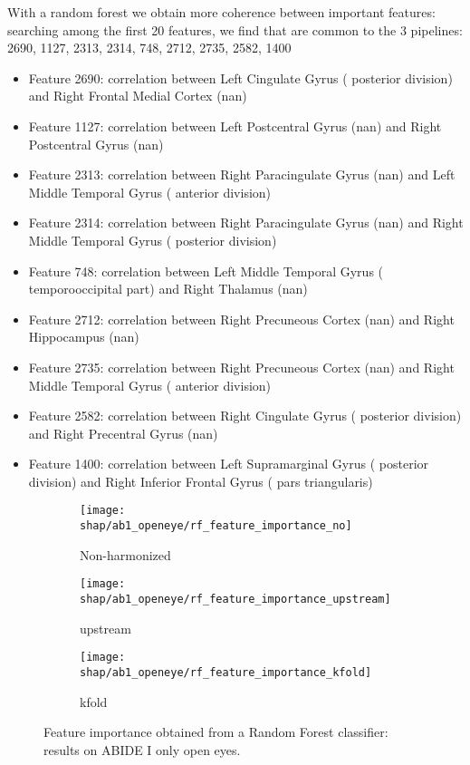 \documentclass[11pt]{report}
\begin{document}
With a random forest we obtain more coherence between important features: searching among the first 20 features, we find that
are common to the 3 pipelines: 2690, 1127, 2313, 2314, 748, 2712, 2735, 2582, 1400



\begin{itemize}
\item Feature 2690: correlation between Left Cingulate Gyrus ( posterior division) and Right Frontal Medial Cortex (nan)
\item Feature 1127: correlation between Left Postcentral Gyrus (nan) and Right Postcentral Gyrus (nan)
\item Feature 2313: correlation between Right Paracingulate Gyrus (nan) and Left Middle Temporal Gyrus ( anterior division)
\item Feature 2314: correlation between Right Paracingulate Gyrus (nan) and Right Middle Temporal Gyrus ( posterior division)
\item Feature 748: correlation between Left Middle Temporal Gyrus ( temporooccipital part) and Right Thalamus (nan)
\item Feature 2712: correlation between Right Precuneous Cortex (nan) and Right Hippocampus (nan)
\item Feature 2735: correlation between Right Precuneous Cortex (nan) and Right Middle Temporal Gyrus ( anterior division)
\item Feature 2582: correlation between Right Cingulate Gyrus ( posterior division) and Right Precentral Gyrus (nan)
\item Feature 1400: correlation between Left Supramarginal Gyrus ( posterior division) and Right Inferior Frontal Gyrus ( pars triangularis)
\end{itemize}


\begin{figure}
\centering
\begin{subfigure}[b]{.45\textwidth}
   \texttt{[image: shap/ab1\_openeye/rf\_feature\_importance\_no]}
   \caption{Non-harmonized}
   \label{}
\end{subfigure}
\begin{subfigure}[b]{.45\textwidth}
   \texttt{[image: shap/ab1\_openeye/rf\_feature\_importance\_upstream]}
   \caption{upstream}
   \label{}
\end{subfigure}
\begin{subfigure}[b]{.45\textwidth}
   \texttt{[image: shap/ab1\_openeye/rf\_feature\_importance\_kfold]}
   \caption{kfold}
   \label{}
\end{subfigure}
\caption{Feature importance obtained from a Random Forest classifier: results on ABIDE I only open eyes.}
\label{fig:rf_feature_importance_ab1}
\end{figure}
\end{document}
